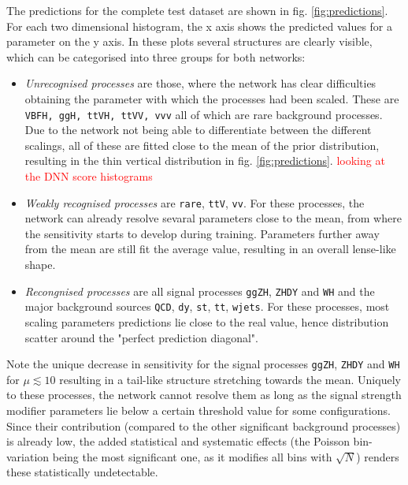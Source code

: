 \Subsection{\textcolor{red}{Network Predictions}}

The predictions for the complete test dataset are shown in fig. \ref{fig:predictions}. For each two dimensional histogram, the x axis shows the predicted values for a parameter on the y axis. In these plots several structures are clearly visible, which can be categorised into three groups for both networks:

\begin{itemize}
	\item[] \textit{Unrecognised processes} are those, where the network has clear difficulties obtaining the parameter with which the processes had been scaled. These are \texttt{VBFH, ggH, ttVH, ttVV, vvv} all of which are rare background processes. Due to the network not being able to differentiate between the different scalings, all of these are fitted close to the mean of the prior distribution, resulting in the thin vertical distribution in fig. \ref{fig:predictions}. \textcolor{red}{looking at the DNN score histograms}
	\item[] \textit{Weakly recognised processes} are \texttt{rare}, \texttt{ttV}, \texttt{vv}. For these processes, the network can already resolve sevaral parameters close to the mean, from where the sensitivity starts to develop during training. Parameters further away from the mean are still fit the average value, resulting in an overall lense-like shape.
	\item[] \textit{Recongnised processes} are all signal processes \texttt{ggZH}, \texttt{ZHDY} and \texttt{WH} and the major background sources \texttt{QCD}, \texttt{dy}, \texttt{st}, \texttt{tt}, \texttt{wjets}. For these processes, most scaling parameters predictions lie close to the real value, hence distribution scatter around the "perfect prediction diagonal".
\end{itemize}

Note the unique decrease in sensitivity for the signal processes \texttt{ggZH}, \texttt{ZHDY} and \texttt{WH} for $\mu\lesssim10$ resulting in a tail-like structure stretching towards the mean. Uniquely to these processes, the network cannot resolve them as long as the signal strength modifier parameters lie below a certain threshold value for some configurations. Since their contribution (compared to the other significant background processes) is already low, the added statistical and systematic effects (the Poisson bin-variation being the most significant one, as it modifies all bins with $\sqrt{N}$) renders these statistically undetectable.

